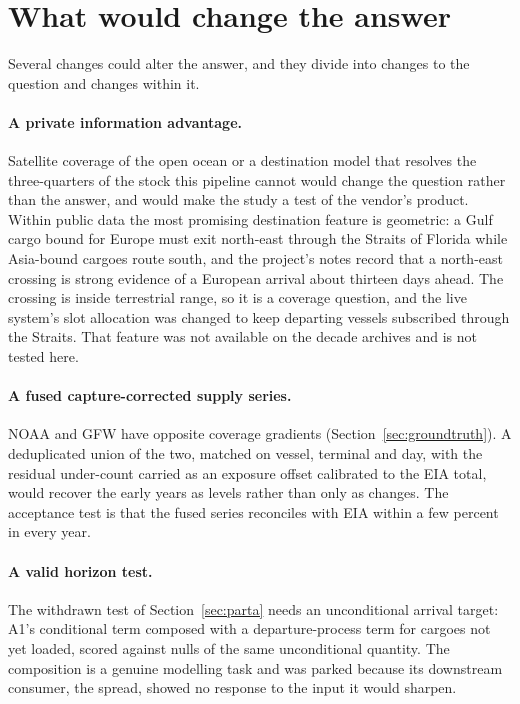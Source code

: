\section{What would change the answer}\label{sec:future}

Several changes could alter the answer, and they divide into changes to the
question and changes within it.

\paragraph{A private information advantage.} Satellite coverage of the open ocean
or a destination model that resolves the three-quarters of the stock this pipeline
cannot would change the question rather than the answer, and would make the study a
test of the vendor's product. Within public data the most promising destination
feature is geometric: a Gulf cargo bound for Europe must exit north-east through the
Straits of Florida while Asia-bound cargoes route south, and the project's notes
record that a north-east crossing is strong evidence of a European arrival about
thirteen days ahead. The crossing is inside terrestrial range, so it is a coverage
question, and the live system's slot allocation was changed to keep departing
vessels subscribed through the Straits. That feature was not available on the
decade archives and is not tested here.

\paragraph{A fused capture-corrected supply series.} NOAA and GFW have opposite
coverage gradients (Section~\ref{sec:groundtruth}). A deduplicated union of the two,
matched on vessel, terminal and day, with the residual under-count carried as an
exposure offset calibrated to the EIA total, would recover the early years as
levels rather than only as changes. The acceptance test is that the fused series
reconciles with EIA within a few percent in every year.

\paragraph{A valid horizon test.} The withdrawn test of Section~\ref{sec:parta}
needs an unconditional arrival target: A1's conditional term composed with a
departure-process term for cargoes not yet loaded, scored against nulls of the same
unconditional quantity. The composition is a genuine modelling task and was parked
because its downstream consumer, the spread, showed no response to the input it
would sharpen.

